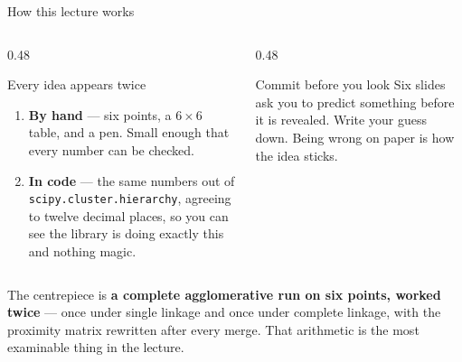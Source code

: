 \documentclass[aspectratio=169]{beamer}
\begin{document}
\begin{frame}[shrink=7]{How this lecture works}
  \begin{columns}[T]
    \begin{column}{0.48\textwidth}
      \begin{block}{Every idea appears twice}
        \begin{enumerate}
          \item \textbf{By hand} --- six points, a $6 \times 6$ table, and a
            pen. Small enough that every number can be checked.
          \item \textbf{In code} --- the same numbers out of
            \texttt{scipy.cluster.hierarchy}, agreeing to twelve decimal
            places, so you can see the library is doing exactly this and
            nothing magic.
        \end{enumerate}
      \end{block}
    \end{column}
    \begin{column}{0.48\textwidth}
      \begin{alertblock}{Commit before you look}
        Six slides ask you to predict something before it is revealed. Write
        your guess down. Being wrong on paper is how the idea sticks.
      \end{alertblock}
    \end{column}
  \end{columns}
  \vspace{0.4em}
  \begin{center}
    \small The centrepiece is \textbf{a complete agglomerative run on six
    points, worked twice} --- once under single linkage and once under
    complete linkage, with the proximity matrix rewritten after every merge.
    That arithmetic is the most examinable thing in the lecture.
  \end{center}
\end{frame}
\end{document}
